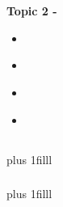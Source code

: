 \documentclass[fleqn]{beamer} %
\newcommand{\sectionIItitle}{}
\newcommand{\sectionIIsubsectionItitle}{}
\newcommand{\sectionIIsubsectionIItitle}{}
\newcommand{\sectionIIsubsectionIIItitle}{}
\newcommand{\sectionIIsubsectionIVtitle}{}
\newcommand{\btVFill}{\vskip0pt plus 1filll}
\begin{document}
	
	\section{\sectionIItitle}\label{sectionII}

		\begin{frame}
			\large \textbf{Topic 2 - \sectionIItitle} \vspace{3mm}\\

			\begin{itemize}
				\item \hyperlink{sectionIIsubsectionI}{\sectionIIsubsectionItitle} \vspc %
				\item \hyperlink{sectionIIsubsectionII}{\sectionIIsubsectionIItitle} \vspc %
				\item \hyperlink{sectionIIsubsectionIII}{\sectionIIsubsectionIIItitle} \vspc %
				\item \hyperlink{sectionIIsubsectionIV}{\sectionIIsubsectionIVtitle} \vspc %
			\end{itemize}

		\end{frame}

		\subsection{\sectionIIsubsectionItitle}\label{sectionIIsubsectionI}

			\begin{frame}[label=sectionIIsubsectionI]
				\frametitle{\sectionIIsubsectionItitle} \scriptsize

				\bigskip	
				
				\btVFill
				
		
			\end{frame}

		    \begin{frame}[label=sectionIIsubsectionI]
				\frametitle{\sectionIIsubsectionItitle} \scriptsize

				
				\btVFill

			
					
			\end{frame}	


		\subsection{\sectionIIsubsectionIItitle}\label{sectionIIsubsectionII}
\end{document}
